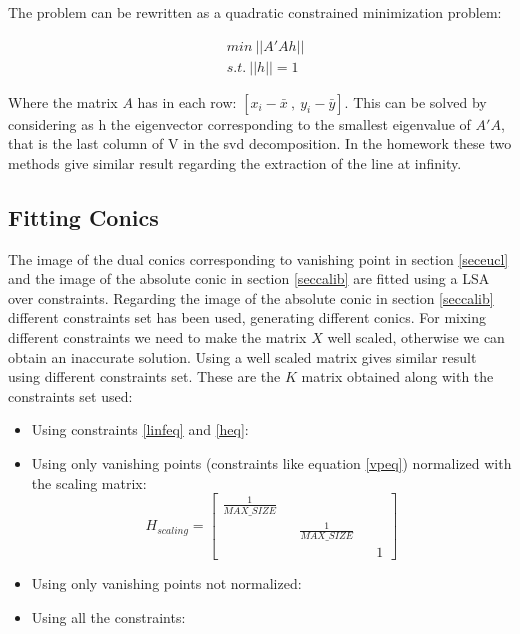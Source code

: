 \documentclass[11pt, oneside]{article}   	%
\begin{document}
The problem can be rewritten as a quadratic constrained minimization problem:

 \begin{subequations}
\begin{align*}
& min \ ||A'Ah|| \\
& s.t. \ ||h|| = 1
\end{align*}
\end{subequations}

Where the matrix $A$ has in each row: $[x_i - \bar{x} \ , \ y_i - \bar{y}]$. 
This can be solved by considering as h the eigenvector corresponding to the smallest eigenvalue of $A'A$, that is the last column of V in the svd decomposition. 
In the homework these two methods give similar result regarding the extraction of the line at infinity.

\subsection{Fitting Conics}

The image of the dual conics corresponding to vanishing point in section \ref{seceucl} and the image of the absolute conic in section \ref{seccalib} are fitted using a LSA over constraints.
Regarding the image of the absolute conic in section \ref{seccalib} different constraints set has been used, generating different conics. For mixing different constraints we need to make the matrix $X$ well scaled, otherwise we can obtain an inaccurate solution. 
Using a well scaled matrix gives similar result using different constraints set. 
These are the $K$ matrix obtained along with the constraints set used:
\begin{itemize}
\item Using constraints \ref{linfeq} and \ref{heq}:
\item Using only vanishing points (constraints like equation \ref{vpeq}) normalized with the scaling matrix:
$$
H_{scaling} = \begin{bmatrix}
\frac{1}{MAX\_SIZE} && && \\
&& \frac{1}{MAX\_SIZE} &&  \\
&& && 1
\end{bmatrix}
$$
\item Using only vanishing points not normalized:
\item Using all the constraints:
\end{itemize}
\end{document}

